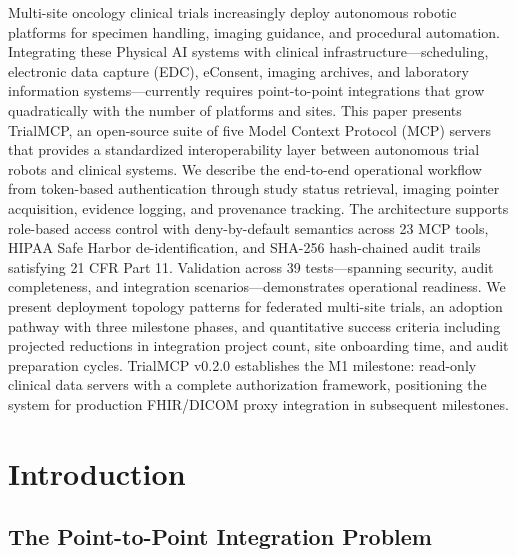 \documentclass[10pt,letterpaper]{article}
\begin{document}
Multi-site oncology clinical trials increasingly deploy autonomous robotic platforms for specimen handling, imaging guidance, and procedural automation. Integrating these Physical AI systems with clinical infrastructure---scheduling, electronic data capture (EDC), eConsent, imaging archives, and laboratory information systems---currently requires point-to-point integrations that grow quadratically with the number of platforms and sites. This paper presents TrialMCP, an open-source suite of five Model Context Protocol (MCP) servers that provides a standardized interoperability layer between autonomous trial robots and clinical systems. We describe the end-to-end operational workflow from token-based authentication through study status retrieval, imaging pointer acquisition, evidence logging, and provenance tracking. The architecture supports role-based access control with deny-by-default semantics across 23 MCP tools, HIPAA Safe Harbor de-identification, and SHA-256 hash-chained audit trails satisfying 21 CFR Part 11. Validation across 39 tests---spanning security, audit completeness, and integration scenarios---demonstrates operational readiness. We present deployment topology patterns for federated multi-site trials, an adoption pathway with three milestone phases, and quantitative success criteria including projected reductions in integration project count, site onboarding time, and audit preparation cycles. TrialMCP v0.2.0 establishes the M1 milestone: read-only clinical data servers with a complete authorization framework, positioning the system for production FHIR/DICOM proxy integration in subsequent milestones.

\vspace{8pt}

\tableofcontents
\newpage

\section{Introduction}

\subsection{The Point-to-Point Integration Problem}
\end{document}
